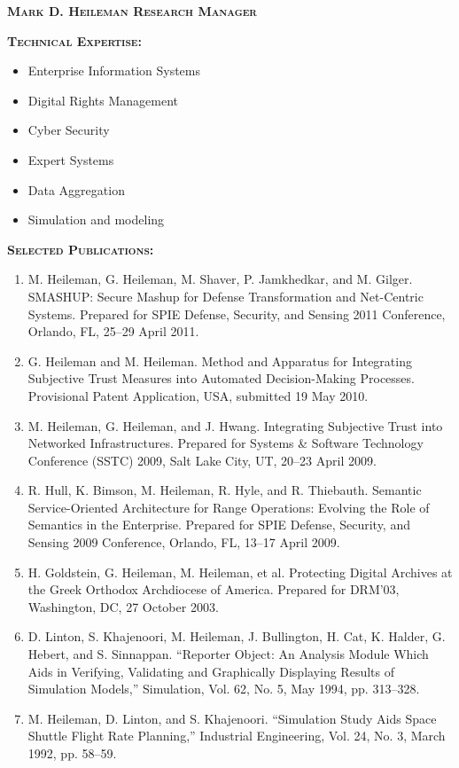 \documentclass{sbir}
\begin{document}
\textbf{\textsc{Mark D. Heileman \hfill Research Manager}}

\vspace{-18pt}
{\textcolor{black}{\makebox[6.5in]{\hrulefill}} 
\textbf{\textsc{Technical Expertise:}}
\vspace{-8pt}
\begin{multicols}{2}
 \begin{itemize}
  \item Enterprise Information Systems
  \item Digital Rights Management
  \item Cyber Security
  \item Expert Systems
  \item Data Aggregation
  \item Simulation and modeling	
 \end{itemize}
\end{multicols}
\vspace{-16pt}
\textbf{\textsc{Selected Publications:}}
\vspace{-8pt}
\begin{enumerate}
\item M. Heileman, G. Heileman, M. Shaver, P. Jamkhedkar, and M. Gilger. SMASHUP: Secure Mashup for Defense Transformation and Net-Centric Systems. Prepared for SPIE Defense, Security, and Sensing 2011 Conference, Orlando, FL, 25--29 April 2011.
\item G. Heileman and M. Heileman. Method and Apparatus for Integrating Subjective Trust Measures into Automated Decision-Making Processes. Provisional Patent Application, USA, submitted 19 May 2010.
\item M. Heileman, G. Heileman, and J. Hwang. Integrating Subjective Trust into Networked Infrastructures. Prepared for Systems \& Software Technology Conference (SSTC) 2009, Salt Lake City, UT, 20--23 April 2009.
\item R. Hull, K. Bimson, M. Heileman, R. Hyle, and R. Thiebauth. Semantic Service-Oriented Architecture for Range Operations: Evolving the Role of Semantics in the Enterprise. Prepared for SPIE Defense, Security, and Sensing 2009 Conference, Orlando, FL, 13--17 April 2009.
\item H. Goldstein, G. Heileman, M. Heileman, et al. Protecting Digital Archives at the Greek Orthodox Archdiocese of America. Prepared for DRM'03, Washington, DC, 27 October 2003.
\item D. Linton, S. Khajenoori, M. Heileman, J. Bullington, H. Cat, K. Halder, G. Hebert, and S. Sinnappan. ``Reporter Object: An Analysis Module Which Aids in Verifying, Validating and Graphically Displaying Results of Simulation Models,'' Simulation, Vol. 62, No. 5, May 1994, pp. 313--328.
\item M. Heileman, D. Linton, and S. Khajenoori. ``Simulation Study Aids Space Shuttle Flight Rate Planning,'' Industrial Engineering, Vol. 24, No. 3, March 1992, pp. 58--59.
\end{enumerate}

}
\end{document}
